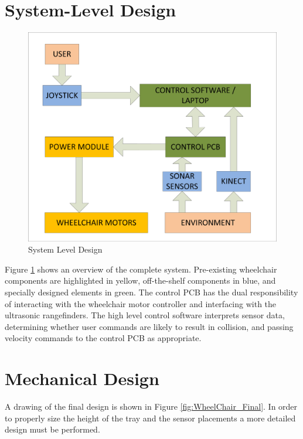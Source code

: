 \documentclass[oneside,final,a4paper]{report}
\begin{document}
\section{System-Level Design}
\begin{figure}[hbt]
 \centering
 \includegraphics[scale=0.7]{System_Level}
 \caption{System Level Design}\label{fig:highlevel}
\end{figure}

Figure \ref{fig:highlevel} shows an overview of the complete system.  Pre-existing wheelchair components are highlighted in yellow, off-the-shelf components in blue, and specially designed elements in green.  The control PCB has the dual responsibility of interacting with the wheelchair motor controller and interfacing with the ultrasonic rangefinders.  The high level control software interprets sensor data, determining whether user commands are likely to result in collision, and passing velocity commands to the control PCB as appropriate.

\section{Mechanical Design}
A drawing of the final design is shown in Figure \ref{fig:WheelChair_Final}. In order to properly size the height of the tray and the sensor placements a more detailed design must be performed.
\end{document}
